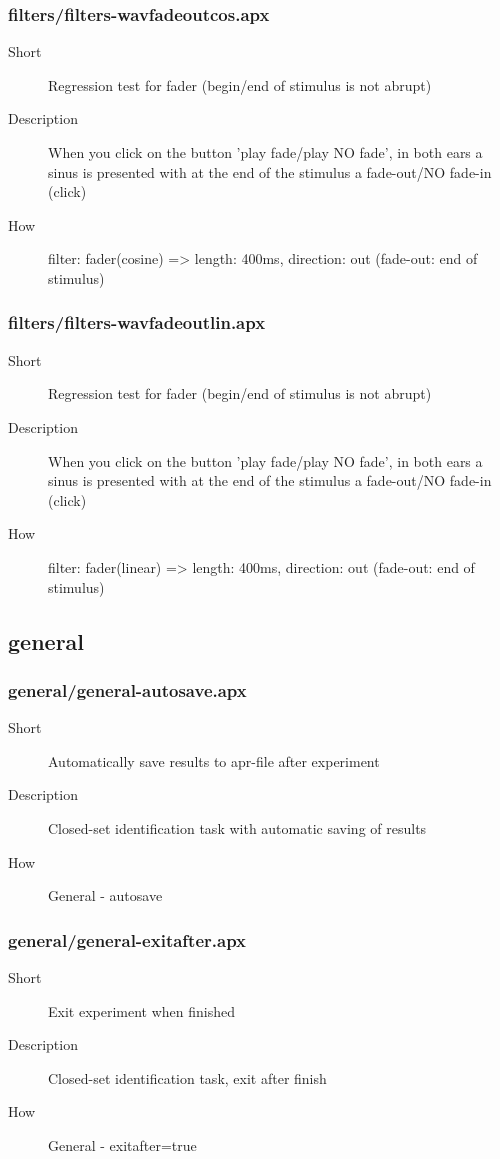 \subsubsection{filters/filters-wavfadeoutcos.apx}
\begin{description}
\item[Short] 
 Regression test for fader (begin/end of stimulus is not abrupt)
\item[Description] 
 When you click on the button 'play fade/play NO fade', in both ears a sinus is presented with at the end of the stimulus a fade-out/NO fade-in (click)
\item[How] 
 filter: fader(cosine) =\textgreater{} length: 400ms, direction: out (fade-out: end of stimulus)
\end{description}

\subsubsection{filters/filters-wavfadeoutlin.apx}
\begin{description}
\item[Short] 
 Regression test for fader (begin/end of stimulus is not abrupt)
\item[Description] 
 When you click on the button 'play fade/play NO fade', in both ears a sinus is presented with at the end of the stimulus a fade-out/NO fade-in (click)
\item[How] 
 filter: fader(linear) =\textgreater{} length: 400ms, direction: out (fade-out: end of stimulus)
\end{description}

\subsection{general}
\subsubsection{general/general-autosave.apx}
\begin{description}
\item[Short] 
 Automatically save results to apr-file after experiment
\item[Description] 
 Closed-set identification task with automatic saving of results
\item[How] 
 General - autosave
\end{description}

\subsubsection{general/general-exitafter.apx}
\begin{description}
\item[Short] 
 Exit experiment when finished
\item[Description] 
 Closed-set identification task, exit after finish
\item[How] 
 General - exitafter=true
\end{description}

